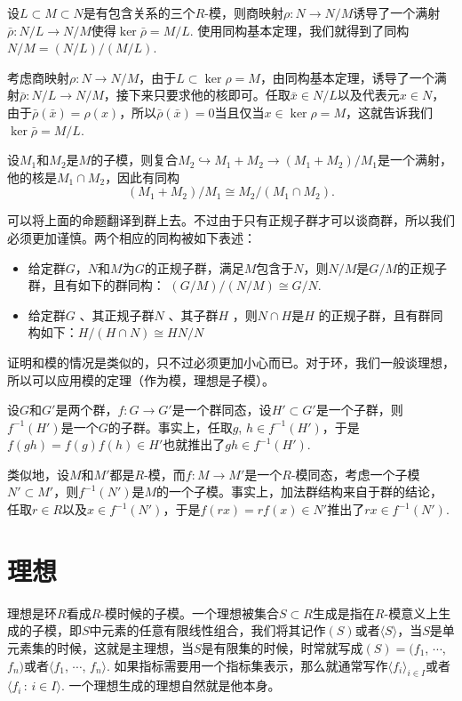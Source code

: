 \para 设$L\subset M \subset N$是有包含关系的三个$R$-模，则商映射$\rho:N\to N/M$诱导了一个满射$\bar{\rho}:N/L \to N/M$使得$\ker \bar{\rho}=M/L$. 使用同构基本定理，我们就得到了同构$N/M=(N/L)/(M/L)$.

考虑商映射$\rho:N\to N/M$，由于$L\subset \ker \rho=M$，由同构基本定理，诱导了一个满射$\bar{\rho}:N/L \to N/M$，接下来只要求他的核即可。任取$\bar{x}\in N/L$以及代表元$x\in N$，由于$\bar{\rho}(\bar{x})=\rho(x)$，所以$\bar{\rho} (\bar{x})=0$当且仅当$x\in \ker \rho =M$，这就告诉我们$\ker \bar{\rho}=M/L$.

\para \label{modiso1}设$M_1$和$M_2$是$M$的子模，则复合$M_2\hookrightarrow M_1+M_2 \to (M_1+M_2)/M_1$是一个满射，他的核是$M_1\cap M_2$，因此有同构
\[
	(M_1+M_2)/M_1\cong M_2/(M_1\cap M_2).
\]

\para 可以将上面的命题翻译到群上去。不过由于只有正规子群才可以谈商群，所以我们必须更加谨慎。两个相应的同构被如下表述：

\begin{itemize}
\item 给定群$G$，$N$和$M$为$G$的正规子群，满足$M$包含于$N$，则$N/M$是$G/M$的正规子群，且有如下的群同构： $ (G/M)/(N/M)\cong G/N$.

\item 给定群$G$ 、其正规子群$N$ 、其子群$H$ ，则$N\cap H$是$H$ 的正规子群，且有群同构如下：$H/(H\cap N)\cong HN/N$
\end{itemize}

证明和模的情况是类似的，只不过必须更加小心而已。对于环，我们一般谈理想，所以可以应用模的定理（作为模，理想是子模）。

\para 设$G$和$G'$是两个群，$f:G\to G'$是一个群同态，设$H'\subset G'$是一个子群，则$f^{-1}(H')$是一个$G$的子群。事实上，任取$g$, $h\in f^{-1}(H')$，于是$f(gh)=f(g)f(h)\in H'$也就推出了$gh\in f^{-1}(H')$. 

类似地，设$M$和$M'$都是$R$-模，而$f:M\to M'$是一个$R$-模同态，考虑一个子模$N'\subset M'$，则$f^{-1}(N')$是$M$的一个子模。事实上，加法群结构来自于群的结论，任取$r\in R$以及$x\in f^{-1}(N')$，于是$f(rx)=rf(x)\in N'$推出了$rx\in f^{-1}(N')$. 

\section{理想}

\para 理想是环$R$看成$R$-模时候的子模。一个理想被集合$S\subset R$生成是指在$R$-模意义上生成的子模，即$S$中元素的任意有限线性组合，我们将其记作$(S)$或者$\langle S\rangle$，当$S$是单元素集的时候，这就是主理想，当$S$是有限集的时候，时常就写成$(S)=(f_1$, $\cdots$, $f_n)$或者$\langle f_1$, $\cdots$, $f_n\rangle$. 如果指标需要用一个指标集表示，那么就通常写作$\langle f_i\rangle_{i\in I}$或者$\langle f_i\,:\,i\in I\rangle$. 一个理想生成的理想自然就是他本身。

